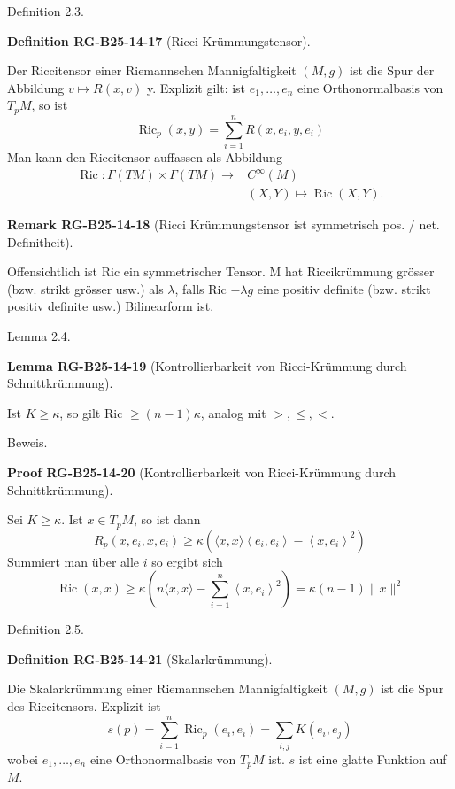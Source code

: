 \documentclass[10pt, letterpaper]{article}
\newcommand{\CustomHeading}[3]{%
  \par\medskip\noindent%
  \textbf{#1 #2} \textnormal{(#3)}.\enskip%
}
\newenvironment{DEF}[2]{\begin{unitbox}\CustomHeading{Definition}{#1}{#2}}{\end{unitbox}}
\newenvironment{LEM}[2]{\begin{unitbox}\CustomHeading{Lemma}{#1}{#2}}{\end{unitbox}}
\newenvironment{REM}[2]{\begin{unitbox}\CustomHeading{Remark}{#1}{#2}}{\end{unitbox}}
\newenvironment{PROOF}[2]{\begin{unitbox}\CustomHeading{Proof}{#1}{#2}}{\end{unitbox}}
\begin{document}
Definition 2.3. 



\begin{DEF}{RG-B25-14-17}{Ricci Krümmungstensor}
Der Riccitensor einer Riemannschen Mannigfaltigkeit $(M, g)$ ist die Spur der Abbildung $v \mapsto R(x, v)$ y. Explizit gilt: ist $e_{1}, \ldots, e_{n}$ eine Orthonormalbasis von $T_{p} M$, so ist
$$
\operatorname{Ric}_{p}(x, y)=\sum_{i=1}^{n} R\left(x, e_{i}, y, e_{i}\right)
$$
Man kann den Riccitensor auffassen als Abbildung
$$
\begin{aligned}
\operatorname{Ric}: \Gamma(T M) \times \Gamma(T M) \rightarrow & C^{\infty}(M) \\
& (X, Y) \mapsto \operatorname{Ric}(X, Y) .
\end{aligned}
$$
\end{DEF}


\begin{REM}{RG-B25-14-18}{Ricci Krümmungstensor ist symmetrisch pos. / net. Definitheit}
Offensichtlich ist Ric ein symmetrischer Tensor. M hat Riccikrümmung grösser (bzw. strikt grösser usw.) als $\lambda$, falls Ric $-\lambda g$ eine positiv definite (bzw. strikt positiv definite usw.) Bilinearform ist.
\end{REM}

Lemma 2.4. 

\begin{LEM}{RG-B25-14-19}{Kontrollierbarkeit von Ricci-Krümmung durch Schnittkrümmung}
Ist $K \geq \kappa$, so gilt Ric $\geq(n-1) \kappa$, analog mit $>, \leq,<$.
\end{LEM}


Beweis. 

\begin{PROOF}{RG-B25-14-20}{Kontrollierbarkeit von Ricci-Krümmung durch Schnittkrümmung}
Sei $K \geq \kappa$. Ist $x \in T_{p} M$, so ist dann
$$
R_{p}\left(x, e_{i}, x, e_{i}\right) \geq \kappa\left(\langle x, x\rangle\left\langle e_{i}, e_{i}\right\rangle-\left\langle x, e_{i}\right\rangle^{2}\right)
$$
Summiert man über alle $i$ so ergibt sich
$$
\operatorname{Ric}(x, x) \geq \kappa\left(n\langle x, x\rangle-\sum_{i=1}^{n}\left\langle x, e_{i}\right\rangle^{2}\right)=\kappa(n-1)\|x\|^{2}
$$
\end{PROOF}



Definition 2.5. 

\begin{DEF}{RG-B25-14-21}{Skalarkrümmung}
Die Skalarkrümmung einer Riemannschen Mannigfaltigkeit $(M, g)$ ist die Spur des Riccitensors. Explizit ist
$$
s(p)=\sum_{i=1}^{n} \operatorname{Ric}_{p}\left(e_{i}, e_{i}\right)=\sum_{i, j} K\left(e_{i}, e_{j}\right)
$$
wobei $e_{1}, \ldots, e_{n}$ eine Orthonormalbasis von $T_{p} M$ ist. $s$ ist eine glatte Funktion auf $M$.
\end{DEF}
\end{document}
